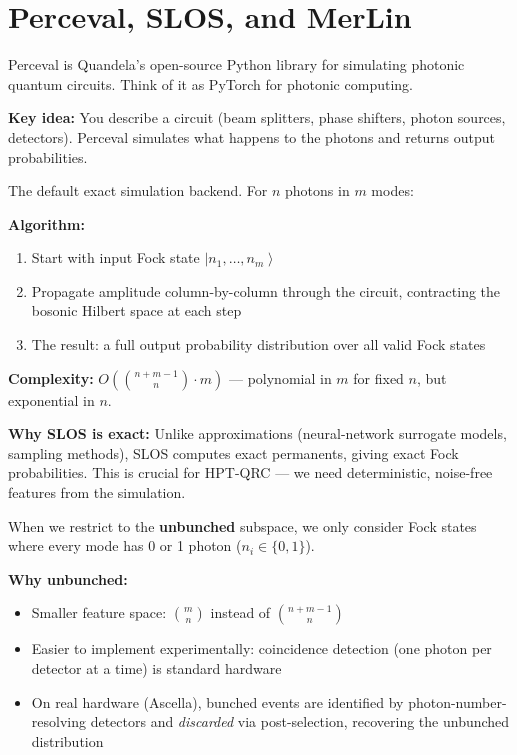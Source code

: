 \documentclass[11pt]{article}
\newcommand{\concept}[2]{%
  \begin{tcolorbox}[conceptbox, title={#1}]
  #2
  \end{tcolorbox}
}
\newcommand{\mathblock}[2]{%
  \begin{tcolorbox}[mathbox, title={Math: #1}]
  #2
  \end{tcolorbox}
}
\providecommand{\ket}[1]{\left| #1 \right\rangle}
\begin{document}
\section{Perceval, SLOS, and MerLin}

\concept{Perceval --- The Photonic Simulation Engine}{
Perceval is Quandela's open-source Python library for simulating photonic
quantum circuits. Think of it as PyTorch for photonic computing.

\textbf{Key idea:} You describe a circuit (beam splitters, phase shifters,
photon sources, detectors). Perceval simulates what happens to the photons
and returns output probabilities.
}

\mathblock{SLOS Backend --- Scalable Linear Optical Simulator}{
The default exact simulation backend. For $n$ photons in $m$ modes:

\textbf{Algorithm:}
\begin{enumerate}
  \item Start with input Fock state $\ket{n_1,\ldots,n_m}$
  \item Propagate amplitude column-by-column through the circuit,
        contracting the bosonic Hilbert space at each step
  \item The result: a full output probability distribution over
        all valid Fock states
\end{enumerate}

\textbf{Complexity:} $O\!\left(\binom{n+m-1}{n} \cdot m\right)$
--- polynomial in $m$ for fixed $n$, but exponential in $n$.

\textbf{Why SLOS is exact:} Unlike approximations (neural-network surrogate
models, sampling methods), SLOS computes exact permanents, giving
exact Fock probabilities. This is crucial for HPT-QRC --- we need
deterministic, noise-free features from the simulation.
}

\concept{ComputationSpace.UNBUNCHED --- At Most One Photon Per Mode}{
When we restrict to the \textbf{unbunched} subspace, we only consider
Fock states where every mode has 0 or 1 photon ($n_i \in \{0,1\}$).

\textbf{Why unbunched:}
\begin{itemize}
  \item Smaller feature space: $\binom{m}{n}$ instead of $\binom{n+m-1}{n}$
  \item Easier to implement experimentally: coincidence detection
        (one photon per detector at a time) is standard hardware
  \item On real hardware (Ascella), bunched events are identified by
        photon-number-resolving detectors and \emph{discarded} via
        post-selection, recovering the unbunched distribution
\end{itemize}
}
\end{document}

